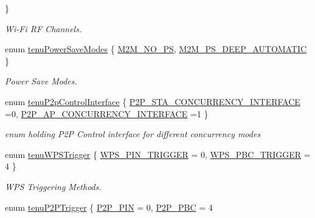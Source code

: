 \begin{DoxyCompactItemize}
 \}\begin{DoxyCompactList}\small\item\em Wi-\/\+Fi RF Channels. \end{DoxyCompactList}
\item 
enum \hyperlink{group__WlanEnums_gae6bd0ac78bfca4cda17d9dbedf79ad7e}{tenu\+Power\+Save\+Modes} \{ \hyperlink{group__WlanEnums_ggae6bd0ac78bfca4cda17d9dbedf79ad7ea3981eb69690432d09abdf1c5dd75d435}{M2\+M\+\_\+\+N\+O\+\_\+\+PS}, 
\hyperlink{group__WlanEnums_ggae6bd0ac78bfca4cda17d9dbedf79ad7ea6e07d1e218848620c1473a92f7a5ec10}{M2\+M\+\_\+\+P\+S\+\_\+\+D\+E\+E\+P\+\_\+\+A\+U\+T\+O\+M\+A\+T\+IC}
 \}\begin{DoxyCompactList}\small\item\em Power Save Modes. \end{DoxyCompactList}
\item 
enum \hyperlink{group__WlanEnums_gaa1d900506fae03d738ed81234d0a4633}{tenu\+P2p\+Control\+Interface} \{ \hyperlink{group__WlanEnums_ggaa1d900506fae03d738ed81234d0a4633acbbb47272c24868f48d51875ce99008b}{P2\+P\+\_\+\+S\+T\+A\+\_\+\+C\+O\+N\+C\+U\+R\+R\+E\+N\+C\+Y\+\_\+\+I\+N\+T\+E\+R\+F\+A\+CE} =0, 
\hyperlink{group__WlanEnums_ggaa1d900506fae03d738ed81234d0a4633a78839b56cae7844156e76d29f090dbf8}{P2\+P\+\_\+\+A\+P\+\_\+\+C\+O\+N\+C\+U\+R\+R\+E\+N\+C\+Y\+\_\+\+I\+N\+T\+E\+R\+F\+A\+CE} =1
 \}\begin{DoxyCompactList}\small\item\em enum holding P2P Control interface for different concurrency modes \end{DoxyCompactList}
\item 
enum \hyperlink{group__WlanEnums_ga5bbde63fb908694883507ec7295f74f6}{tenu\+W\+P\+S\+Trigger} \{ \hyperlink{group__WlanEnums_gga5bbde63fb908694883507ec7295f74f6ae52305c62b5997a9f4f85b039062465c}{W\+P\+S\+\_\+\+P\+I\+N\+\_\+\+T\+R\+I\+G\+G\+ER} = 0, 
\hyperlink{group__WlanEnums_gga5bbde63fb908694883507ec7295f74f6aa578860ada0f036843221e9a5e87d934}{W\+P\+S\+\_\+\+P\+B\+C\+\_\+\+T\+R\+I\+G\+G\+ER} = 4
 \}\begin{DoxyCompactList}\small\item\em W\+PS Triggering Methods. \end{DoxyCompactList}
\item 
enum \hyperlink{group__WlanEnums_ga0b97cca65d26d6163cabcb708e5759df}{tenu\+P2\+P\+Trigger} \{ \hyperlink{group__WlanEnums_gga0b97cca65d26d6163cabcb708e5759dfad460eb448f86bb487da38d2a4adc6056}{P2\+P\+\_\+\+P\+IN} = 0, 
\hyperlink{group__WlanEnums_gga0b97cca65d26d6163cabcb708e5759dfacf766568f64b21ce7adc08da42cf6ffd}{P2\+P\+\_\+\+P\+BC} = 4

\end{DoxyCompactItemize}
